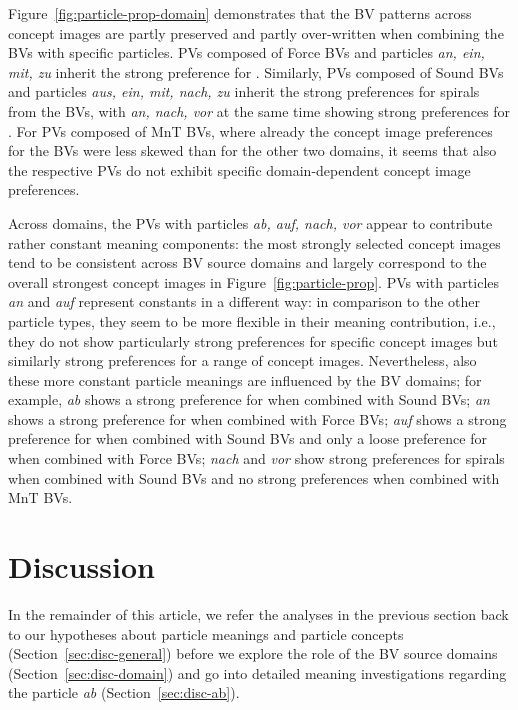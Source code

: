 \documentclass[output=paper]{langsci/langscibook}
\begin{document}
Figure~\ref{fig:particle-prop-domain} demonstrates that the BV
patterns across concept images are partly preserved and partly
over-written when combining the BVs with specific particles. PVs
composed of Force BVs and particles \textit{an, ein, mit, zu}
inherit the strong preference for . Similarly, PVs
composed of Sound BVs and particles \textit{aus, ein, mit,
  nach, zu} inherit the strong preferences for spirals from the BVs,
with \textit{an, nach, vor} at the same time showing strong
preferences for . For PVs composed of MnT
BVs, where already the concept image preferences for the BVs were less
skewed than for the other two domains, it seems that also the
respective PVs do not exhibit specific domain-dependent concept image
preferences.

Across domains, the PVs with particles \textit{ab, auf, nach, vor}
appear to contribute rather constant meaning components: the most
strongly selected concept images tend to be consistent across BV source domains
and largely correspond to the overall strongest concept images in
Figure~\ref{fig:particle-prop}. PVs with particles \textit{an} and
\textit{auf} represent constants in a different way: in comparison to
the other particle types, they seem to be more flexible in their
meaning contribution, i.e., they do not show particularly strong
preferences for specific concept images but similarly strong preferences for a
range of concept images.  Nevertheless, also these more constant particle
meanings are influenced by the BV domains; for example, \textit{ab}
shows a strong preference for  when combined with
Sound BVs; \textit{an} shows a strong preference for
 when combined with Force BVs; \textit{auf}
shows a strong preference for  when combined with
Sound BVs and only a loose preference for
 when combined with Force BVs;
\textit{nach} and \textit{vor} show strong preferences for spirals
when combined with Sound BVs and no strong preferences when
combined with MnT BVs.


\section{Discussion}
\label{sec:2discussion}

In the remainder of this article, we refer the analyses in the
previous section back to our hypotheses about particle meanings and
particle concepts (Section~\ref{sec:disc-general}) before we explore
the role of the BV source domains (Section~\ref{sec:disc-domain}) and
go into detailed meaning investigations regarding the particle
\textit{ab} (Section~\ref{sec:disc-ab}).
\end{document}
